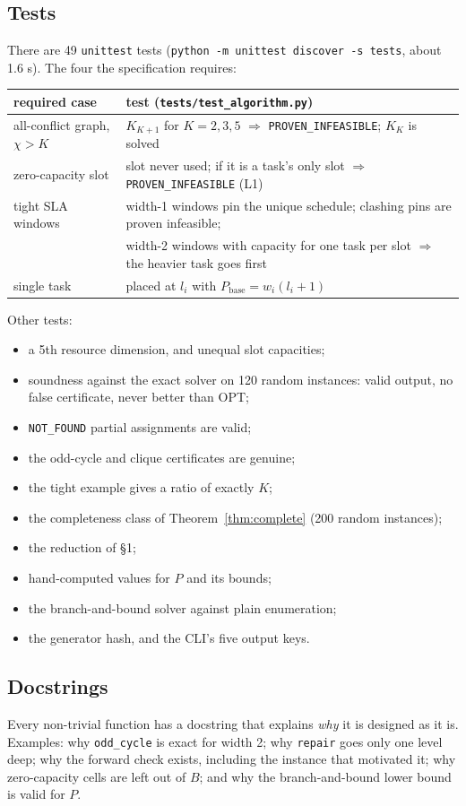 \subsection{Tests}
There are 49 \texttt{unittest} tests (\texttt{python -m unittest discover
-s tests}, about 1.6 s). The four the specification requires:
\begin{center}\small
\begin{tabular}{l l}
\toprule
required case & test (\texttt{tests/test\_algorithm.py})\\
\midrule
all-conflict graph, $\chi>K$ & $K_{K+1}$ for $K=2,3,5$ $\Rightarrow$ \texttt{PROVEN\_INFEASIBLE}; $K_K$ is solved\\
zero-capacity slot & slot never used; if it is a task's only slot $\Rightarrow$ \texttt{PROVEN\_INFEASIBLE} (L1)\\
tight SLA windows & width-1 windows pin the unique schedule; clashing pins are proven infeasible;\\
 & width-2 windows with capacity for one task per slot $\Rightarrow$ the heavier task goes first\\
single task & placed at $l_i$ with $P_{\text{base}}=w_i(l_i+1)$\\
\bottomrule
\end{tabular}
\end{center}
Other tests:
\begin{itemize}
\item a 5th resource dimension, and unequal slot capacities;
\item soundness against the exact solver on 120 random instances: valid
  output, no false certificate, never better than OPT;
\item \texttt{NOT\_FOUND} partial assignments are valid;
\item the odd-cycle and clique certificates are genuine;
\item the tight example gives a ratio of exactly $K$;
\item the completeness class of Theorem~\ref{thm:complete} (200 random
  instances);
\item the reduction of \S1;
\item hand-computed values for $P$ and its bounds;
\item the branch-and-bound solver against plain enumeration;
\item the generator hash, and the CLI's five output keys.
\end{itemize}

\subsection{Docstrings}
Every non-trivial function has a docstring that explains \emph{why} it is
designed as it is. Examples: why \texttt{odd\_cycle} is exact for width 2;
why \texttt{repair} goes only one level deep; why the forward check exists,
including the instance that motivated it; why zero-capacity cells are left
out of $B$; and why the branch-and-bound lower bound is valid for $P$.
